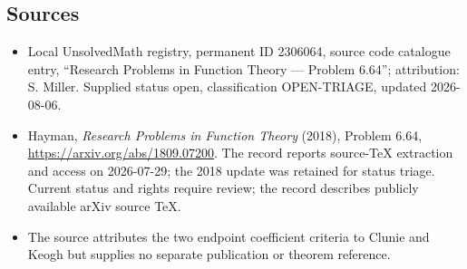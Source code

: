 \documentclass[11pt]{article}
\begin{document}
\subsection{Sources}
\begin{itemize}
\item Local UnsolvedMath registry, permanent ID 2306064, source code catalogue entry, ``Research Problems in Function Theory --- Problem 6.64''; attribution: S. Miller. Supplied status open, classification OPEN-TRIAGE, updated 2026-08-06.
\item Hayman, \emph{Research Problems in Function Theory} (2018), Problem 6.64, \url{https://arxiv.org/abs/1809.07200}. The record reports source-TeX extraction and access on 2026-07-29; the 2018 update was retained for status triage. Current status and rights require review; the record describes publicly available arXiv source TeX.
\item The source attributes the two endpoint coefficient criteria to Clunie and Keogh but supplies no separate publication or theorem reference.
\end{itemize}
\end{document}
